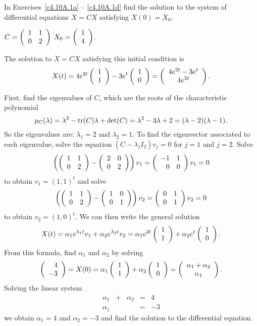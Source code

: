 \documentclass{ximera}
\begin{document}
\noindent In Exercises~\ref{c4.10A.1a} -- \ref{c4.10A.1d} find the solution
to the system of differential equations $\dot{X} = CX$ satisfying $X(0)=X_0$.
\begin{exercise}  \label{c4.10A.1a}
$C = \left(\begin{array}{rr} 1 & 1\\ 0 &2\end{array}\right)$ \AND $X_0 = \left(\begin{array}{r} 1 \\ 4\end{array}\right)$.

\begin{solution}
\ans The solution to $\dot{X} = CX$ satisfying this
initial condition is
\[
X(t) = 4e^{2t}\left(\begin{array}{r} 1 \\ 1\end{array}\right) - 3e^t\left(\begin{array}{r} 1 \\ 0\end{array}\right)
= \left(\begin{array}{c} 4e^{2t} - 3e^t \\ 4e^{2t}\end{array}\right).
\]

\soln First, find the eigenvalues of $C$, which are the roots of the
characteristic polynomial
\[
p_C(\lambda) = \lambda^2 - {\rm tr}(C)\lambda + \det(C) =
\lambda^2 - 3\lambda + 2 = (\lambda - 2)(\lambda - 1).
\]
So the eigenvalues are: $\lambda_1 = 2$ and $\lambda_2 = 1$.
To find the eigenvector associated to each eigenvalue, solve
the equation $(C - \lambda_jI_2)v_j = 0$ for $j = 1$ and $j = 2$.  Solve
\[
\left(\left(\begin{array}{rr} 1 & 1\\ 0 &2\end{array}\right) - \left(\begin{array}{rr} 2 & 0\\ 0 &2\end{array}\right)\right)v_1 =
\left(\begin{array}{rr} -1 & 1\\ 0 &0\end{array}\right)v_1 = 0
\]
to obtain $v_1 = (1,1)^t$ and solve
\[
\left(\left(\begin{array}{rr} 1 & 1\\ 0 &2\end{array}\right) - \left(\begin{array}{rr} 1 & 0\\ 0 &1\end{array}\right)\right)v_2 =
\left(\begin{array}{rr} 0 & 1\\ 0 &1\end{array}\right)v_2 = 0
\]
to obtain $v_2 = (1,0)^t$.  We can then write the general solution
\[
X(t) = \alpha_1e^{\lambda_1 t}v_1 + \alpha_2e^{\lambda_2 t}v_2
= \alpha_1e^{2t}\left(\begin{array}{r} 1 \\ 1\end{array}\right) + \alpha_2e^t\left(\begin{array}{r} 1 \\ 0\end{array}\right).
\]
From this formula, find $\alpha_1$ and $\alpha_2$ by solving
\[
\left(\begin{array}{r} 4 \\ -3\end{array}\right) = X(0) = \alpha_1\left(\begin{array}{r} 1 \\ 1\end{array}\right) + \alpha_2\left(\begin{array}{r} 1 \\ 0\end{array}\right) =
\left(\begin{array}{c} \alpha_1 + \alpha_2 \\ \alpha_1\end{array}\right).
\]
Solving the linear system
\[
\begin{array}{rrrrr}
\alpha_1 & + & \alpha_2 & = & 4 \\
\alpha_1 & & & = & -3
\end{array}
\]
we obtain $\alpha_1 = 4$ and $\alpha_2 = -3$ and find the
solution to the differential equation.


\end{solution}
\end{exercise}
\end{document}
